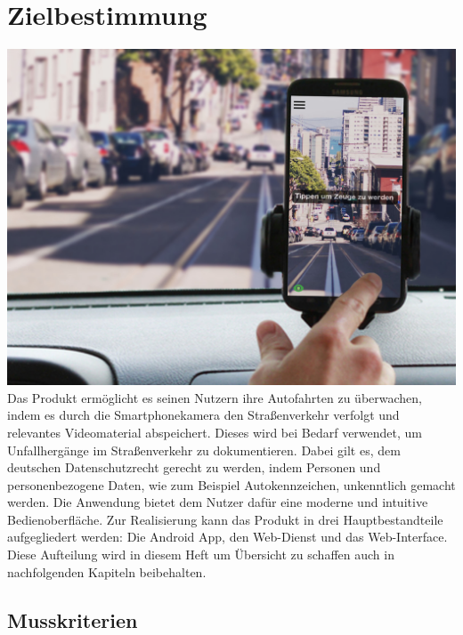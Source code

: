 \chapter{Zielbestimmung}

\includegraphics[width=\textwidth]{subtopicsFuncspec/Res//Mockups/Portrait_camera_view_car.jpg}\\[0.5cm]

Das Produkt ermöglicht es seinen Nutzern ihre Autofahrten zu überwachen, indem es durch die \gls{Smartphone}kamera den Straßenverkehr verfolgt und relevantes Videomaterial  abspeichert. Dieses wird bei Bedarf verwendet, um Unfallhergänge im Straßenverkehr zu dokumentieren. Dabei gilt es, dem deutschen Datenschutzrecht gerecht zu werden, indem Personen und personenbezogene Daten, wie zum Beispiel Autokennzeichen, unkenntlich gemacht werden. Die Anwendung bietet dem Nutzer dafür eine moderne und intuitive Bedienoberfläche.\newline
Zur Realisierung kann das Produkt in drei Hauptbestandteile aufgegliedert werden: Die \gls{Android} \gls{App}, den \gls{Web-Dienst} und das \gls{Web-Interface}. Diese Aufteilung wird in diesem Heft um Übersicht zu schaffen auch in nachfolgenden Kapiteln beibehalten.

\section{Musskriterien}
